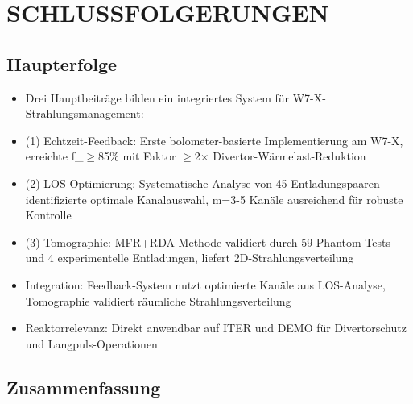 \documentclass[11pt,a4paper]{article}
\begin{document}
\section{SCHLUSSFOLGERUNGEN}

\subsection{Haupterfolge}

\begin{itemize}
\item Drei Hauptbeiträge bilden ein integriertes System für W7-X-Strahlungsmanagement:
\item (1) Echtzeit-Feedback: Erste bolometer-basierte Implementierung am W7-X, erreichte f_{}$\geq$85\% mit Faktor $\geq$2$\times$ Divertor-Wärmelast-Reduktion
\item (2) LOS-Optimierung: Systematische Analyse von 45 Entladungspaaren identifizierte optimale Kanalauswahl, m=3-5 Kanäle ausreichend für robuste Kontrolle
\item (3) Tomographie: MFR+RDA-Methode validiert durch 59 Phantom-Tests und 4 experimentelle Entladungen, liefert 2D-Strahlungsverteilung
\item Integration: Feedback-System nutzt optimierte Kanäle aus LOS-Analyse, Tomographie validiert räumliche Strahlungsverteilung
\item Reaktorrelevanz: Direkt anwendbar auf ITER und DEMO für Divertorschutz und Langpuls-Operationen
\end{itemize}

\subsection{Zusammenfassung}
\end{document}
